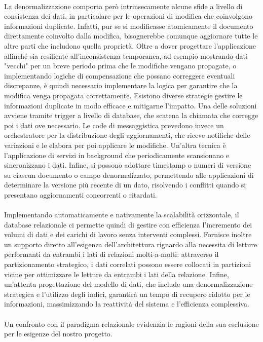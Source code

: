 \\
La denormalizzazione comporta però intrinsecamente
alcune sfide a livello di consistenza dei dati,
in particolare per le operazioni di modifica che coinvolgono informazioni duplicate.
Infatti, pur se si modificasse atomicamente il documento direttamente coinvolto dalla modifica,
bisognerebbe comunque aggiornare tutte le altre parti che includono quella proprietà.
Oltre a dover progettare l'applicazione affinché sia resiliente all'inconsistenza temporanea,
ad esempio mostrando dati "vecchi" per un breve periodo prima che le modifiche vengano propagate,
o implementando logiche di compensazione che possano correggere eventuali discrepanze,
è quindi necessario implementare la logica per garantire che la modifica venga propagata correttamente.
Esistono diverse strategie gestire le informazioni duplicate in modo efficace e mitigarne l'impatto.
Una delle soluzioni avviene tramite trigger a livello di database,
che scatena la chiamata che corregge poi i dati ove necessario.
Le code di messaggistica prevedono invece un orchestratore per la distribuzione degli aggiornamenti,
che riceve notifiche delle variazioni e le elabora per poi applicare le modifiche.
Un'altra tecnica è l'applicazione di servizi in background che periodicamente scansionano e sincronizzano i dati.
Infine, si possono adottare timestamp o numeri di versione su ciascun documento o campo denormalizzato,
permettendo alle applicazioni di determinare la versione più recente di un dato,
risolvendo i conflitti quando si presentano aggiornamenti concorrenti o ritardati.\\
\\
Implementando automaticamente e nativamente la scalabilità orizzontale,
il database relazionale ci permette quindi di gestire con efficienza
l'incremento dei volumi di dati e dei carichi di lavoro senza interventi complessi.
Fornisce inoltre un supporto diretto all'esigenza dell'architettura
riguardo alla necessita di letture performanti
da entrambi i lati di relazioni molti-a-molti:
attraverso il partizionamento strategico,
i dati correlati possono essere collocati in partizioni vicine
per ottimizzare le letture da entrambi i lati della relazione.
Infine, un'attenta progettazione del modello di dati,
che include una denormalizzazione strategica e l'utilizzo degli indici,
garantirà un tempo di recupero ridotto per le informazioni,
massimizzando la reattività del sistema e l'efficienza complessiva.\\
\\
Un confronto con il paradigma relazionale evidenzia le ragioni della sua esclusione per le esigenze del nostro progetto.
